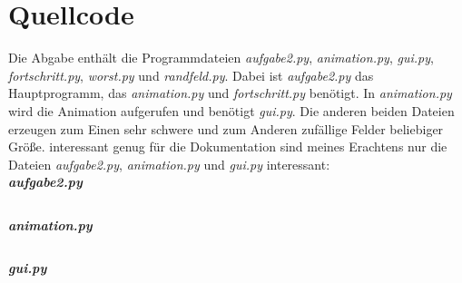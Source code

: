 \documentclass[12pt]{article}
\begin{document}
\section{Quellcode}
Die Abgabe enthält die Programmdateien \textit{aufgabe2.py}, \textit{animation.py}, \textit{gui.py}, \textit{fortschritt.py}, \textit{worst.py} und \textit{randfeld.py}. Dabei ist \textit{aufgabe2.py} das Hauptprogramm, das \textit{animation.py} und \textit{fortschritt.py} benötigt. In \textit{animation.py} wird die Animation aufgerufen und benötigt \textit{gui.py}. Die anderen beiden Dateien erzeugen zum Einen sehr schwere und zum Anderen zufällige Felder beliebiger Größe. interessant genug für die Dokumentation sind meines Erachtens nur die Dateien \textit{aufgabe2.py}, \textit{animation.py} und \textit{gui.py} interessant:\\

\textit{\textbf{aufgabe2.py}}
\inputminted[numbersep=5pt, tabsize=2, label=aufgabe1.py, breaklines, breaksymbolleft={}, linenos=true]{python3}{/home/nicholas/informatik/bwinf/Runde2/Aufgabe2/Abgabe/Aufgabe2/aufgabe2.py}
\textit{\textbf{animation.py}}
\inputminted[numbersep=5pt, tabsize=2, label=aufgabe1.py, breaklines, breaksymbolleft={}, linenos=true]{python3}{/home/nicholas/informatik/bwinf/Runde2/Aufgabe2/Abgabe/Aufgabe2/animation.py}
\textit{\textbf{gui.py}}
\inputminted[numbersep=5pt, tabsize=2, label=aufgabe1.py, breaklines, breaksymbolleft={}, linenos=true]{python3}{/home/nicholas/informatik/bwinf/Runde2/Aufgabe2/Abgabe/Aufgabe2/gui.py}
\end{document}
